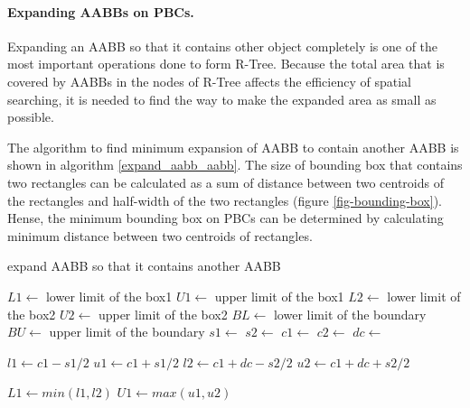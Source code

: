 \documentclass[10pt,letterpaper,twocolumn]{article}
\begin{document}
\paragraph{Expanding AABBs on PBCs.}
Expanding an AABB so that it contains other object completely is one of the most
important operations done to form R-Tree. Because the total area that is covered by
AABBs in the nodes of R-Tree affects the efficiency of spatial searching, it is
needed to find the way to make the expanded area as small as possible.

The algorithm to find minimum expansion of AABB to contain another AABB is shown
in algorithm \ref{expand_aabb_aabb}. The size of bounding box that contains two
rectangles can be calculated as a sum of distance between two centroids of the
rectangles and half-width of the two rectangles (figure \ref{fig-bounding-box}).
Hense, the minimum bounding box on PBCs can be determined by calculating
minimum distance between two centroids of rectangles.

\begin{algorithm}
    \caption{expand AABB so that it contains another AABB}
    \label{expand_aabb_aabb}
    \begin{algorithmic}
        \State $L1 \gets$ lower limit of the box1
        \State $U1 \gets$ upper limit of the box1
        \State $L2 \gets$ lower limit of the box2
        \State $U2 \gets$ upper limit of the box2
        \State $BL \gets$ lower limit of the boundary
        \State $BU \gets$ upper limit of the boundary
            \State $s1 \gets$ 
            \State $s2 \gets$ 
            \State $c1 \gets$ 
            \State $c2 \gets$ 
            \State $dc \gets$ 

            \State $l1 \gets c1 - s1 / 2$
            \State $u1 \gets c1 + s1 / 2$
            \State $l2 \gets c1 + dc - s2 / 2$
            \State $u2 \gets c1 + dc + s2 / 2$

            \State $L1 \gets min(l1, l2)$
            \State $U1 \gets max(u1, u2)$
            \State {}
            \State \Return
        \EndFunction
     \end{algorithmic}
\end{algorithm}
\end{document}
